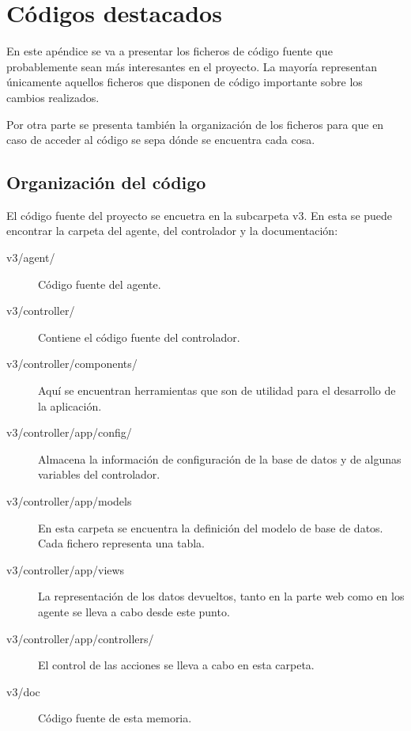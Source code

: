 \chapter{Códigos destacados} 

En este apéndice se va a presentar los ficheros de código fuente que probablemente sean más interesantes en el proyecto. La mayoría representan únicamente aquellos ficheros que disponen de código importante sobre los cambios realizados.

Por otra parte se presenta también la organización de los ficheros para que en caso de acceder al código se sepa dónde se encuentra cada cosa.

\section{Organización del código}

El código fuente del proyecto se encuetra en la subcarpeta v3. En esta se puede encontrar la carpeta del agente, del controlador y la documentación:

\begin{description}
	\item[v3/agent/] Código fuente del agente.

	\item[v3/controller/] Contiene el código fuente del controlador.
	
	\item[v3/controller/components/] Aquí se encuentran herramientas que son de utilidad para el desarrollo de la aplicación.

	\item[v3/controller/app/config/] Almacena la información de configuración de la base de datos y de algunas variables del controlador.

	\item[v3/controller/app/models] En esta carpeta se encuentra la definición del modelo de base de datos. Cada fichero representa una tabla.

	\item[v3/controller/app/views] La representación de los datos devueltos, tanto en la parte web como en los agente se lleva a cabo desde este punto.

	\item[v3/controller/app/controllers/] El control de las acciones se lleva a cabo en esta carpeta.

	\item[v3/doc] Código fuente de esta memoria.
\end{description}

